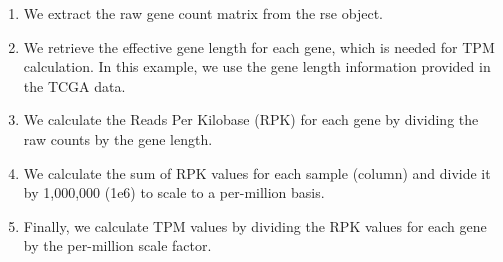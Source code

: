 \documentclass[
]{book}
\begin{document}
\begin{enumerate}
\def\labelenumi{\arabic{enumi}.}
\item
  We extract the raw gene count matrix from the rse object.
\item
  We retrieve the effective gene length for each gene, which is needed for TPM calculation. In this example, we use the gene length information provided in the TCGA data.
\item
  We calculate the Reads Per Kilobase (RPK) for each gene by dividing the raw counts by the gene length.
\item
  We calculate the sum of RPK values for each sample (column) and divide it by 1,000,000 (1e6) to scale to a per-million basis.
\item
  Finally, we calculate TPM values by dividing the RPK values for each gene by the per-million scale factor.
\end{enumerate}
\end{document}
